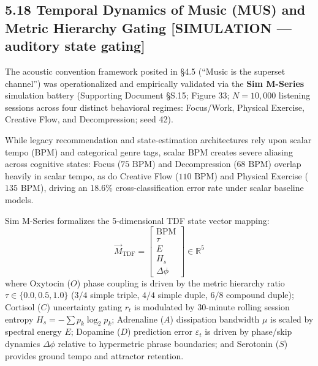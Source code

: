\documentclass[
]{article}
\begin{document}
\subsection{5.18 Temporal Dynamics of Music (MUS) and Metric Hierarchy
Gating {[}SIMULATION --- auditory state
gating{]}}\label{temporal-dynamics-of-music-mus-and-metric-hierarchy-gating-simulation-auditory-state-gating}

The acoustic convention framework posited in §4.5 (``Music is the
superset channel'') was operationalized and empirically validated via
the \textbf{Sim M-Series} simulation battery (Supporting Document §S.15;
Figure 33; \(N = 10,000\) listening sessions across four distinct
behavioral regimes: Focus/Work, Physical Exercise, Creative Flow, and
Decompression; seed 42).

While legacy recommendation and state-estimation architectures rely upon
scalar tempo (BPM) and categorical genre tags, scalar BPM creates severe
aliasing across cognitive states: Focus (\(75\text{ BPM}\)) and
Decompression (\(68\text{ BPM}\)) overlap heavily in scalar tempo, as do
Creative Flow (\(110\text{ BPM}\)) and Physical Exercise
(\(135\text{ BPM}\)), driving an 18.6\% cross-classification error rate
under scalar baseline models.

Sim M-Series formalizes the 5-dimensional TDF state vector mapping: \[
\vec{M}_{\text{TDF}} = \begin{bmatrix} \text{BPM} \\ \tau \\ E \\ H_s \\ \Delta \phi \end{bmatrix} \in \mathbb{R}^5
\] where Oxytocin (\(O\)) phase coupling is driven by the metric
hierarchy ratio \(\tau \in \{0.0, 0.5, 1.0\}\) (\(3/4\) simple triple,
\(4/4\) simple duple, \(6/8\) compound duple); Cortisol (\(C\))
uncertainty gating \(r_t\) is modulated by 30-minute rolling session
entropy \(H_s = -\sum p_k \log_2 p_k\); Adrenaline (\(A\)) dissipation
bandwidth \(\mu\) is scaled by spectral energy \(E\); Dopamine (\(D\))
prediction error \(\varepsilon_t\) is driven by phase/skip dynamics
\(\Delta \phi\) relative to hypermetric phrase boundaries; and Serotonin
(\(S\)) provides ground tempo and attractor retention.
\end{document}
